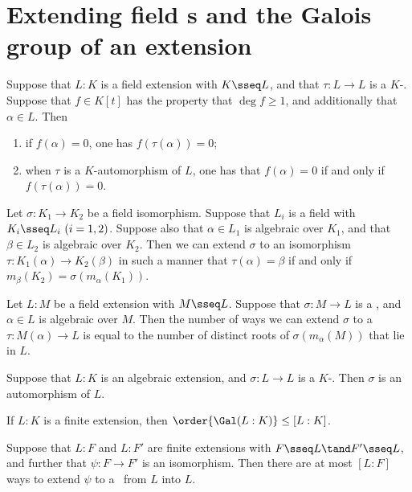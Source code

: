 \documentclass{article}
\begin{document}
\section{Extending field \homo s and the Galois group of an extension}
  \begin{proposition}
    Suppose that $L:K$ is a field extension with $K\sseq L$, and that $\tau:L\to L$ is a $K$-\homo. Suppose that $f\in K[t]$ has the property that $\deg f\geq 1$, and additionally that $\alpha\in L$. Then
    \begin{enumerate}[label=(\roman*)]
      \item if $f(\alpha)=0$, one has $f(\tau(\alpha))=0$;
      \item when $\tau$ is a $K$-automorphism of $L$, one has that $f(\alpha)=0$ if and only if $f(\tau(\alpha))=0$.
    \end{enumerate}
  \end{proposition}

  \begin{theorem}
    Let $\sigma:K_1\to K_2$ be a field isomorphism. Suppose that $L_i$ is a field with $K_i\sseq L_i\ (i=1,2)$. Suppose also that $\alpha\in L_1$ is algebraic over $K_1$, and that $\beta\in L_2$ is algebraic over $K_2$. Then we can extend $\sigma$ to an isomorphism $\tau:K_1(\alpha)\to K_2(\beta)$ in such a manner that $\tau(\alpha)=\beta$ if and only if $m_\beta(K_2)=\sigma(m_\alpha(K_1))$.
  \end{theorem}

  \begin{corollary}
    Let $L:M$ be a field extension with $M\sseq L$. Suppose that $\sigma:M\to L$ is a \homo, and $\alpha\in L$ is algebraic over $M$. Then the number of ways we can extend $\sigma$ to a \homo~$\tau:M(\alpha)\to L$ is equal to the number of distinct roots of $\sigma(m_\alpha(M))$ that lie in $L$.
  \end{corollary}

  \begin{theorem}
    Suppose that $L:K$ is an algebraic extension, and $\sigma:L\to L$ is a $K$-\homo. Then $\sigma$ is an automorphism of $L$.
  \end{theorem}

  \begin{theorem}
    If $L:K$ is a finite extension, then $\order{\Gal(L:K)}\leq [L:K]$.
  \end{theorem}

  \begin{corollary}
    Suppose that $L:F$ and $L:F'$ are finite extensions with $F\sseq L\tand F'\sseq L$, and further that $\psi:F\to F'$ is an isomorphism. Then there are at most $[L:F]$ ways to extend $\psi$ to a \homo~from $L$ into $L$.
  \end{corollary}
\end{document}
